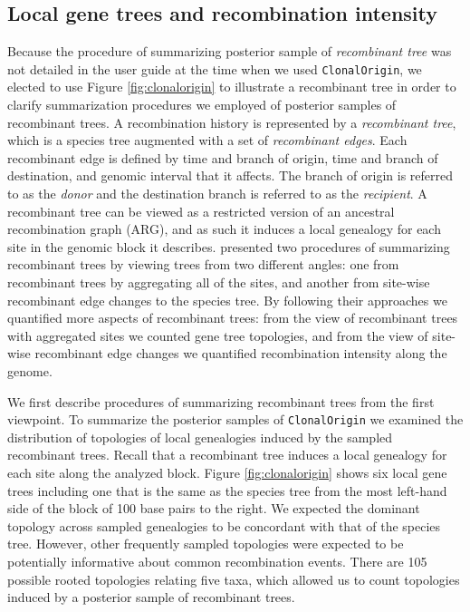 \documentclass[english]{article}
\begin{document}
\subsection{Local gene trees and recombination intensity}
Because the procedure of summarizing posterior sample of \textit{recombinant
tree} was not detailed in the user guide at the time when we used
\texttt{ClonalOrigin}, we elected to use Figure \ref{fig:clonalorigin} to
illustrate a recombinant tree in order to clarify summarization procedures we
employed of posterior samples of recombinant trees.  A recombination history is
represented by a \textit{recombinant tree}, which is a species tree augmented
with a set of \textit{recombinant edges}.  Each recombinant edge is defined by
time and branch of origin, time and branch of destination, and genomic interval
that it affects. The branch of origin is referred to as the \textit{donor} and
the destination branch is referred to as the \textit{recipient}. A recombinant
tree can be viewed as a restricted version of an ancestral recombination graph
(ARG), and as such it induces a local genealogy for each site in the genomic
block it describes.  \citet{Didelot2010} presented two procedures of summarizing
recombinant trees by viewing trees from two different angles: one from
recombinant trees by aggregating all of the sites, and another from site-wise
recombinant edge changes to the species tree.  By following their approaches we
quantified more aspects of recombinant trees: from the view of recombinant trees
with aggregated sites we counted gene tree topologies, and from the view of
site-wise recombinant edge changes we quantified recombination intensity along
the genome.

We first describe procedures of summarizing recombinant trees from the first
viewpoint.  To summarize the posterior samples of \texttt{ClonalOrigin} we
examined the distribution of topologies of local genealogies induced by the
sampled recombinant trees. Recall that a recombinant tree induces a local
genealogy for each site along the analyzed block.  Figure \ref{fig:clonalorigin}
shows six local gene trees including one that is the same as the species tree
from the most left-hand side of the block of 100 base pairs to the right.  We
expected the dominant topology across sampled genealogies to be concordant with
that of the species tree. However, other frequently sampled topologies were
expected to be potentially informative about common recombination events. There
are 105 possible rooted topologies relating five taxa, which allowed us to count
topologies induced by a posterior sample of recombinant trees.  
\end{document}
